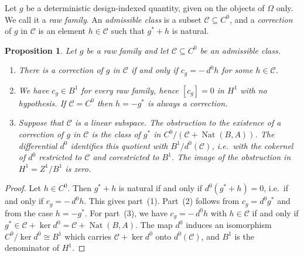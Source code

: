 \documentclass[11pt,a4paper]{article}
\theoremstyle{plain}
\newtheorem{proposition}[theorem]{Proposition}
\theoremstyle{definition}
\theoremstyle{remark}
\newcommand{\cat}[1]{\mathsf{#1}}
\newcommand{\catO}{\cat{\Omega}}
\DeclareMathOperator{\Nat}{Nat}
\begin{document}
Let $g$ be a deterministic design-indexed quantity, given on the objects of
$\catO$ only. We call it a \emph{raw family}. An \emph{admissible class} is a
subset $\mathcal{C} \subseteq C^{0}$, and a \emph{correction} of $g$ in
$\mathcal{C}$ is an element $h \in \mathcal{C}$ such that $g^{*} + h$ is
natural.

\begin{proposition}\label{wprop:obstruction}
Let $g$ be a raw family and let $\mathcal{C} \subseteq C^{0}$ be an admissible
class.
\begin{enumerate}
\item There is a correction of $g$ in $\mathcal{C}$ if and only if
$c_g = -\,d^{0}h$ for some $h \in \mathcal{C}$.
\item We have $c_g \in B^{1}$ for every raw family, hence $[c_g] = 0$ in
$H^{1}$ with no hypothesis. If $\mathcal{C} = C^{0}$ then $h = -g^{*}$ is
always a correction.
\item Suppose that $\mathcal{C}$ is a linear subspace. The obstruction to the
existence of a correction of $g$ in $\mathcal{C}$ is the class of $g^{*}$ in
$C^{0}/(\mathcal{C} + \Nat(B,A))$. The differential $d^{0}$ identifies this
quotient with $B^{1}/d^{0}(\mathcal{C})$, i.e.\ with the cokernel of $d^{0}$
restricted to $\mathcal{C}$ and corestricted to $B^{1}$. The image of the
obstruction in $H^{1} = Z^{1}/B^{1}$ is zero.
\end{enumerate}
\end{proposition}

\begin{proof}
Let $h \in C^{0}$. Then $g^{*}+h$ is natural if and only if
$d^{0}(g^{*}+h) = 0$, i.e.\ if and only if $c_g = -\,d^{0}h$. This gives
part~(1). Part~(2) follows from $c_g = d^{0}g^{*}$ and from the case
$h = -g^{*}$. For part~(3), we have $c_g = -\,d^{0}h$ with
$h \in \mathcal{C}$ if and only if
$g^{*} \in \mathcal{C} + \ker d^{0} = \mathcal{C} + \Nat(B,A)$. The map $d^{0}$
induces an isomorphism $C^{0}/\ker d^{0} \cong B^{1}$ which carries
$\mathcal{C} + \ker d^{0}$ onto $d^{0}(\mathcal{C})$, and $B^{1}$ is the
denominator of $H^{1}$.
\end{proof}
\end{document}
